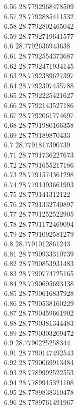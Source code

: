 {6.56	28.7792968478509\\
6.57	28.7792885411532\\
6.58	28.7792802465042\\
6.59	28.7792719641577\\
6.6	28.7792636943638\\
6.61	28.7792554373687\\
6.62	28.7792471934145\\
6.63	28.7792389627397\\
6.64	28.7792307455788\\
6.65	28.7792225421627\\
6.66	28.7792143527186\\
6.67	28.7792061774697\\
6.68	28.7791980166358\\
6.69	28.779189870433\\
6.7	28.7791817390739\\
6.71	28.7791736227673\\
6.72	28.7791655217186\\
6.73	28.7791574361298\\
6.74	28.7791493661993\\
6.75	28.779141312122\\
6.76	28.7791332740897\\
6.77	28.7791252522905\\
6.78	28.7791172469094\\
6.79	28.7791092581279\\
6.8	28.7791012861243\\
6.81	28.7790933310739\\
6.82	28.7790853931483\\
6.83	28.7790774725165\\
6.84	28.7790695693438\\
6.85	28.7790616837928\\
6.86	28.7790538160229\\
6.87	28.7790459661902\\
6.88	28.7790381344483\\
6.89	28.7790303209472\\
6.9	28.7790225258344\\
6.91	28.7790147492543\\
6.92	28.7790069913484\\
6.93	28.7789992522553\\
6.94	28.7789915321108\\
6.95	28.7789838310478\\
6.96	28.7789761491967\\
}
